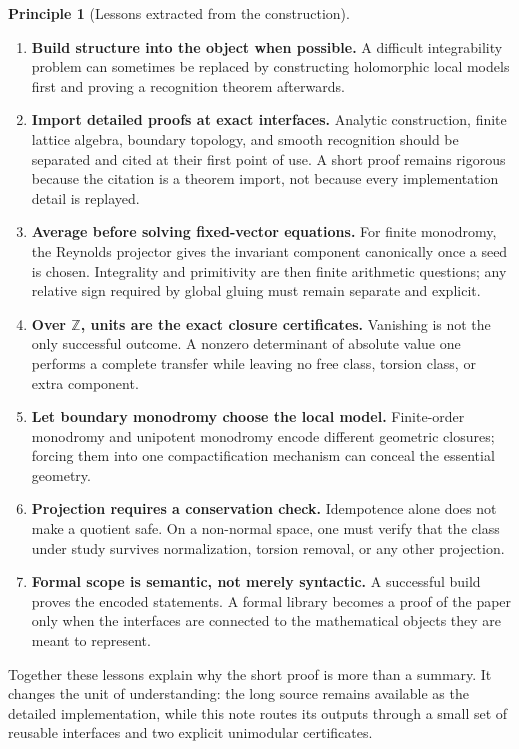 \documentclass[11pt,reqno]{amsart}
\numberwithin{equation}{section}
\newcommand{\Z}{\mathbb Z}
\theoremstyle{definition}
\newtheorem{principle}[principle]{Principle}
\begin{document}
\begin{principle}[Lessons extracted from the construction]\label{pr:lessons}
\begin{enumerate}[label=\textup{(\arabic*)}]
\item \textbf{Build structure into the object when possible.} A difficult integrability problem can sometimes be replaced by constructing holomorphic local models first and proving a recognition theorem afterwards.
\item \textbf{Import detailed proofs at exact interfaces.} Analytic construction, finite lattice algebra, boundary topology, and smooth recognition should be separated and cited at their first point of use. A short proof remains rigorous because the citation is a theorem import, not because every implementation detail is replayed.
\item \textbf{Average before solving fixed-vector equations.} For finite monodromy, the Reynolds projector gives the invariant component canonically once a seed is chosen. Integrality and primitivity are then finite arithmetic questions; any relative sign required by global gluing must remain separate and explicit.
\item \textbf{Over $\Z$, units are the exact closure certificates.} Vanishing is not the only successful outcome. A nonzero determinant of absolute value one performs a complete transfer while leaving no free class, torsion class, or extra component.
\item \textbf{Let boundary monodromy choose the local model.} Finite-order monodromy and unipotent monodromy encode different geometric closures; forcing them into one compactification mechanism can conceal the essential geometry.
\item \textbf{Projection requires a conservation check.} Idempotence alone does not make a quotient safe. On a non-normal space, one must verify that the class under study survives normalization, torsion removal, or any other projection.
\item \textbf{Formal scope is semantic, not merely syntactic.} A successful build proves the encoded statements. A formal library becomes a proof of the paper only when the interfaces are connected to the mathematical objects they are meant to represent.
\end{enumerate}
\end{principle}

Together these lessons explain why the short proof is more than a summary. It changes the unit of understanding: the long source remains available as the detailed implementation, while this note routes its outputs through a small set of reusable interfaces and two explicit unimodular certificates.
\end{document}
